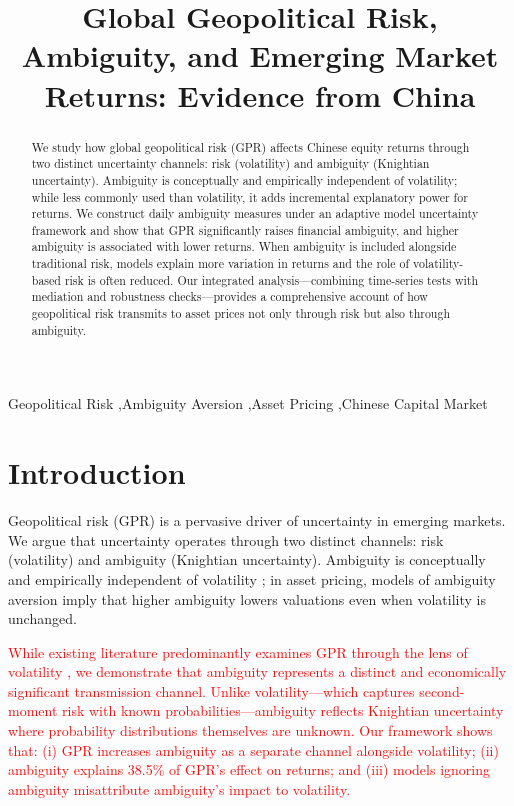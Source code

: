 \documentclass[preprint,12pt,authoryear]{elsarticle}
\begin{document}
\begin{frontmatter}

\title{Global Geopolitical Risk, Ambiguity, and Emerging Market Returns: Evidence from China}

\begin{abstract}
We study how global geopolitical risk (GPR) affects Chinese equity returns through two distinct uncertainty channels: risk (volatility) and ambiguity (Knightian uncertainty). Ambiguity is conceptually and empirically independent of volatility; while less commonly used than volatility, it adds incremental explanatory power for returns. We construct daily ambiguity measures under an adaptive model uncertainty framework and show that GPR significantly raises financial ambiguity, and higher ambiguity is associated with lower returns. When ambiguity is included alongside traditional risk, models explain more variation in returns and the role of volatility-based risk is often reduced. Our integrated analysis—combining time-series tests with mediation and robustness checks—provides a comprehensive account of how geopolitical risk transmits to asset prices not only through risk but also through ambiguity.
\end{abstract}

\begin{keyword}
Geopolitical Risk \sep Ambiguity Aversion \sep Asset Pricing \sep Chinese Capital Market 
\end{keyword}

\end{frontmatter}

\section{Introduction}

Geopolitical risk (GPR) is a pervasive driver of uncertainty in emerging markets. We argue that uncertainty operates through two distinct channels: risk (volatility) and ambiguity (Knightian uncertainty). Ambiguity is conceptually and empirically independent of volatility \citep{Knight1921, Ellsberg1961}; in asset pricing, models of ambiguity aversion \citep{Gilboa1989, Klibanoff2005} imply that higher ambiguity lowers valuations even when volatility is unchanged.

\textcolor{red}{While existing literature predominantly examines GPR through the lens of volatility \citep{Bouri2021, Apergis2021}, we demonstrate that ambiguity represents a distinct and economically significant transmission channel. Unlike volatility---which captures second-moment risk with known probabilities---ambiguity reflects Knightian uncertainty where probability distributions themselves are unknown. Our framework shows that: (i) GPR increases ambiguity as a separate channel alongside volatility; (ii) ambiguity explains 38.5\% of GPR's effect on returns; and (iii) models ignoring ambiguity misattribute ambiguity's impact to volatility.}
\end{document}
